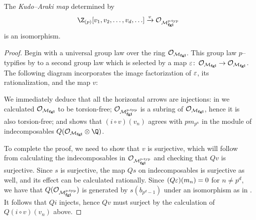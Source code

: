 \begin{theorem}\label{KudoArakiIsomorphism}
The \textit{Kudo--Araki map} determined by  \[\Z_{(p)}[v_1, v_2, \ldots, v_d, \ldots] \xrightarrow{v} \sheaf O_{\moduli{fgl}^{\ptyp}}\] is an isomorphism.
\end{theorem}
\begin{proof}
Begin with a universal group law over the ring \(\mathcal{O}_{\mathcal{M}_{\mathbf{fgl}}}\).  This group law \(p\)--typifies by  to a second group law which is selected by a map \(\varepsilon\colon\thinspace \mathcal{O}_{\mathcal{M}_{\mathbf{fgl}}} \to \mathcal{O}_{\mathcal{M}_{\mathbf{fgl}}}\).  The following diagram incorporates the image factorization of \(\varepsilon\), its rationalization, and the map \(v\):
\begin{center}
\end{center}
We immediately deduce that all the horizontal arrows are injections: in  we calculated \(\mathcal{O}_{\mathcal{M}_{\mathbf{fgl}}}\) to be torsion-free; \(\mathcal{O}_{\mathcal{M}_{\mathbf{fgl}}^{\mathit{p}\text{-}\mathrm{typ}}}\) is a subring of \(\mathcal{O}_{\mathcal{M}_{\mathbf{fgl}}}\), hence it is also torsion-free; and  shows that \((i \circ v)(v_n)\) agrees with \(pm_{p^n}\) in the module of indecomposables \(Q(\sheaf O_{\moduli{fgl}} \otimes \Q)\).

To complete the proof, we need to show that \(v\) is surjective, which will follow from calculating the indecomposables in \(\mathcal{O}_{\mathcal{M}_{\mathbf{fgl}}^{\mathit{p}\text{-}\mathrm{typ}}}\) and checking that \(Qv\) is surjective.  Since \(s\) is surjective, the map \(Qs\) on indecomposables is surjective as well, and its effect can be calculated rationally.  Since \((Q\varepsilon)(m_n) = 0\) for \(n \ne p^d\), we have that \(Q(\mathcal{O}_{\mathcal{M}_{\mathbf{fgl}}^{\mathit{p}\text{-}\mathrm{typ}}})\) is generated by \(s(b_{p^d-1})\) under an isomorphism as in .  It follows that \(Qi\) injects, hence \(Qv\) must surject by the calculation of \(Q(i \circ v)(v_n)\) above.
\end{proof}

